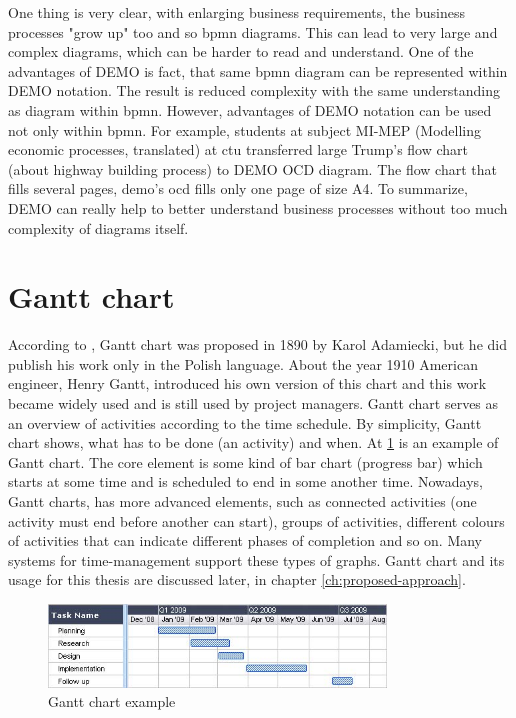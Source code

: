 One thing is very clear, with enlarging business requirements, the business processes "grow up" too and so \gls{bpmn} diagrams. This can lead to very large and complex diagrams, which can be harder to read and understand. One of the advantages of DEMO is fact, that same \gls{bpmn} diagram can be represented within DEMO notation. The result is reduced complexity with the same understanding as diagram within \gls{bpmn}. However, advantages of DEMO notation can be used not only within \gls{bpmn}. For example, students at subject MI-MEP (Modelling economic processes, translated) at \gls{ctu}\cite{ccmi-2018} transferred large Trump's flow chart\cite{quartz-trump-2017} (about highway building process) to DEMO OCD diagram. The flow chart that fills several pages, \gls{demo}'s \gls{ocd} fills only one page of size A4. 
To summarize, DEMO can really help to better understand business processes without too much complexity of diagrams itself.

\section{Gantt chart}
According to \cite{gantt-chart-2018}, Gantt chart was proposed in 1890 by Karol Adamiecki, but he did publish his work only in the Polish language. About the year 1910 American engineer, Henry Gantt, introduced his own version of this chart and this work became widely used and is still used by project managers. 
Gantt chart serves as an overview of activities according to the time schedule. By simplicity, Gantt chart shows, what has to be done (an activity) and when.
At \cref{fig:gantt-chart-example} is an example of Gantt chart. The core element is some kind of bar chart (progress bar) which starts at some time and is scheduled to end in some another time.
Nowadays, Gantt charts, has more advanced elements, such as connected activities (one activity must end before another can start), groups of activities, different colours of activities that can indicate different phases of completion and so on. Many systems for time-management support these types of graphs.
Gantt chart and its usage for this thesis are discussed later, in chapter \cref{ch:proposed-approach}.

\begin{figure}[ht!]
	\centering
    \includegraphics[width=0.8\textwidth]{img/gantt-chart-example.jpg}
    \caption{Gantt chart example\cite{gantt-chart-2018}}
    \label{fig:gantt-chart-example}
\end{figure}

